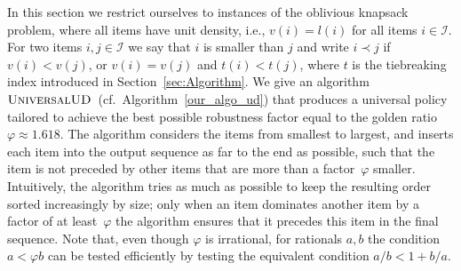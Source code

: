 \documentclass[11pt]{article}
\newcommand{\I}{\mathcal{I}}
\begin{document}
In this section we restrict ourselves to instances of the oblivious
knapsack problem, where all items have unit density, i.e., $v(i)=l(i)$
for all items $i\in\I$. For two items $i,j\in\I$ we say that $i$
is smaller than $j$ and write $i\prec j$ if $v(i)<v(j)$, or $v(i)=v(j)$
and $t(i)<t(j)$, where $t$ is the tiebreaking index introduced in
Section~\ref{sec:Algorithm}. We give an algorithm $\textsc{UniversalUD}$~(cf.~Algorithm~\ref{our_algo_ud})
that produces a universal policy tailored to achieve the best possible
robustness factor equal to the golden ratio $\varphi\approx1.618$.
The algorithm considers the items from smallest to largest, and inserts
each item into the output sequence as far to the end as possible,
such that the item is not preceded by other items that are more than
a factor~$\varphi$ smaller. Intuitively, the algorithm tries as
much as possible to keep the resulting order sorted increasingly by
size; only when an item dominates another item by a factor of at least~$\varphi$
the algorithm ensures that it precedes this item in the final sequence.
Note that, even though $\varphi$ is irrational, for rationals $a,b$
the condition $a<\varphi b$ can be tested efficiently by testing
the equivalent condition $a/b<1+b/a$.
\end{document}
